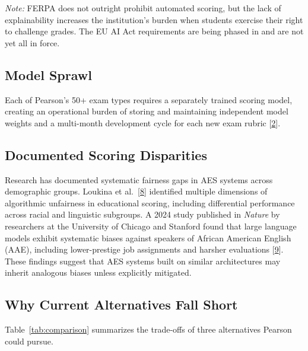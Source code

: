 \documentclass[12pt]{article}
\begin{document}
\textit{Note:} FERPA does not outright prohibit automated scoring, but the lack of explainability increases the institution's burden when students exercise their right to challenge grades. The EU AI Act requirements are being phased in and are not yet all in force.

\subsection{Model Sprawl}

Each of Pearson's 50+ exam types requires a separately trained scoring model, creating an operational burden of storing and maintaining independent model weights and a multi-month development cycle for each new exam rubric [\hyperlink{ref2}{2}].

\subsection{Documented Scoring Disparities}

Research has documented systematic fairness gaps in AES systems across demographic groups. Loukina et al.\ [\hyperlink{ref8}{8}] identified multiple dimensions of algorithmic unfairness in educational scoring, including differential performance across racial and linguistic subgroups. A 2024 study published in \textit{Nature} by researchers at the University of Chicago and Stanford found that large language models exhibit systematic biases against speakers of African American English (AAE), including lower-prestige job assignments and harsher evaluations [\hyperlink{ref9}{9}]. These findings suggest that AES systems built on similar architectures may inherit analogous biases unless explicitly mitigated.

\subsection{Why Current Alternatives Fall Short}

Table~\ref{tab:comparison} summarizes the trade-offs of three alternatives Pearson could pursue.
\end{document}
